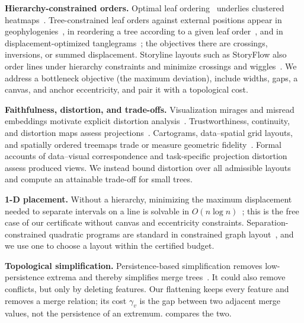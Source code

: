 \documentclass[review]{vgtc}                 %
\begin{document}
\textbf{Hierarchy-constrained orders.}
Optimal leaf ordering~\cite{BarJoseph:2001:OLO} underlies clustered heatmaps~\cite{Eisen:1998:CA}. Tree-constrained leaf orders against external positions appear in geophylogenies~\cite{Klawitter:2025:GP}, in reordering a tree according to a given leaf order~\cite{Bulteau:2022:RT}, and in displacement-optimized tanglegrams~\cite{Huson:2026:DOT}; the objectives there are crossings, inversions, or summed displacement. Storyline layouts such as StoryFlow also order lines under hierarchy constraints and minimize crossings and wiggles~\cite{Liu:2013:SF}. We address a bottleneck objective (the maximum deviation), include widths, gaps, a canvas, and anchor eccentricity, and pair it with a topological cost.

\textbf{Faithfulness, distortion, and trade-offs.}
Visualization mirages and misread embeddings motivate explicit distortion analysis~\cite{McNutt:2020:SVM,Wattenberg:2016:TSNE}. Trustworthiness, continuity, and distortion maps assess projections~\cite{Venna:2001:NP,Aupetit:2007:VD,Rauscher:2025:1DO,Rauscher:2026:VB}. Cartograms, data--spatial grid layouts, and spatially ordered treemaps trade or measure geometric fidelity~\cite{Nusrat:2016:CART,vanBeusekom:2023:DSL,Wood:2008:SOT}. Formal accounts of data--visual correspondence and task-specific projection distortion~\cite{Kindlmann:2014:AVD,Nguyen:2013:FGV,Nonato:2019:MP} assess produced views. We instead bound distortion over all admissible layouts and compute an attainable trade-off for small trees.

\textbf{1-D placement.}
Without a hierarchy, minimizing the maximum displacement needed to separate intervals on a line is solvable in $O(n\log n)$~\cite{Li:2019:SOI}; this is the free case of our certificate without canvas and eccentricity constraints. Separation-constrained quadratic programs are standard in constrained graph layout~\cite{Dwyer:2006:IPSEP}, and we use one to choose a layout within the certified budget.

\textbf{Topological simplification.}
Persistence-based simplification removes low-persistence extrema and thereby simplifies merge trees~\cite{Edelsbrunner:2002:TPS,Carr:2004:SFI,Tierny:2012:GTS}. It could also remove conflicts, but only by deleting features. Our flattening keeps every feature and removes a merge relation; its cost $\gamma_v$ is the gap between two adjacent merge values, not the persistence of an extremum.  compares the two.
\end{document}
